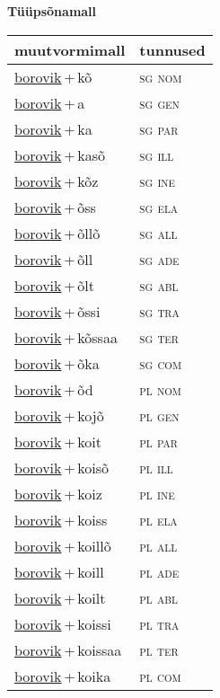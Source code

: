 
\vspace{1.8em}
\begin{minipage}{\textwidth}
\textbf{Tüüpsõnamall \,}\\

\begin{sideways}
\begin{tabular}{l l}
muutvormimall & tunnused \\
\hline
\underline{borovik}\,+\,kõ & \textsc{ sg nom } \\
\underline{borovik}\,+\,a & \textsc{ sg gen } \\
\underline{borovik}\,+\,ka & \textsc{ sg par } \\
\underline{borovik}\,+\,kasõ & \textsc{ sg ill } \\
\underline{borovik}\,+\,kõz & \textsc{ sg ine } \\
\underline{borovik}\,+\,õss & \textsc{ sg ela } \\
\underline{borovik}\,+\,õllõ & \textsc{ sg all } \\
\underline{borovik}\,+\,õll & \textsc{ sg ade } \\
\underline{borovik}\,+\,õlt & \textsc{ sg abl } \\
\underline{borovik}\,+\,õssi & \textsc{ sg tra } \\
\underline{borovik}\,+\,kõssaa & \textsc{ sg ter } \\
\underline{borovik}\,+\,õka & \textsc{ sg com } \\
\underline{borovik}\,+\,õd & \textsc{ pl nom } \\
\underline{borovik}\,+\,kojõ & \textsc{ pl gen } \\
\underline{borovik}\,+\,koit & \textsc{ pl par } \\
\underline{borovik}\,+\,koisõ & \textsc{ pl ill } \\
\underline{borovik}\,+\,koiz & \textsc{ pl ine } \\
\underline{borovik}\,+\,koiss & \textsc{ pl ela } \\
\underline{borovik}\,+\,koillõ & \textsc{ pl all } \\
\underline{borovik}\,+\,koill & \textsc{ pl ade } \\
\underline{borovik}\,+\,koilt & \textsc{ pl abl } \\
\underline{borovik}\,+\,koissi & \textsc{ pl tra } \\
\underline{borovik}\,+\,koissaa & \textsc{ pl ter } \\
\underline{borovik}\,+\,koika & \textsc{ pl com } \\
\end{tabular}
\end{sideways}
\label{tab:tüüpsõnamall-borovikkõ}

\end{minipage}

